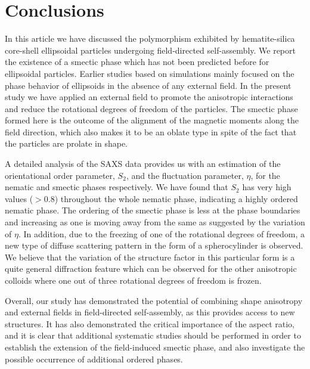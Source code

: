 \documentclass[aps,prl,preprint,superscriptaddress]{revtex4-1}
\begin{document}
\section*{Conclusions}
In this article we have discussed the polymorphism exhibited by hematite-silica core-shell ellipsoidal particles undergoing field-directed self-assembly. We report the existence of a smectic phase which has not been predicted before for ellipsoidal particles. Earlier studies based on simulations mainly focused on the phase behavior of ellipsoids in the absence of any external field. In the present study we have applied an external field to promote the anisotropic interactions and reduce the rotational degrees of freedom of the particles. The smectic phase formed here is the outcome of the alignment of the magnetic moments along the field direction, which also makes it to be an oblate type in spite of the fact that the particles are prolate in shape.\par
A detailed analysis of the SAXS data provides us with an estimation of the orientational order parameter, $S_2$, and the fluctuation parameter, $\eta$, for the nematic and smectic phases respectively. We have found that $S_2$ has very high values ($>0.8$) throughout the whole nematic phase, indicating a highly ordered nematic phase. The ordering of the smectic phase is less at the phase boundaries and increasing as one is moving away from the same as suggested by the variation of $\eta$. In addition, due to the freezing of one of the rotational degrees of freedom, a new type of diffuse scattering pattern in the form of a spherocylinder is observed. We believe that the variation of the structure factor in this particular form is a quite general diffraction feature which can be observed for the other anisotropic colloids where one out of three rotational degrees of freedom is frozen.\par 
Overall, our study has demonstrated the potential of combining shape anisotropy and external fields in field-directed self-assembly, as this provides access to new structures. It has also demonstrated the critical importance of the aspect ratio, and it is clear that additional systematic studies should be performed in order to establish the extension of the field-induced smectic phase, and also investigate the possible occurrence of additional ordered phases.\par
\end{document}
